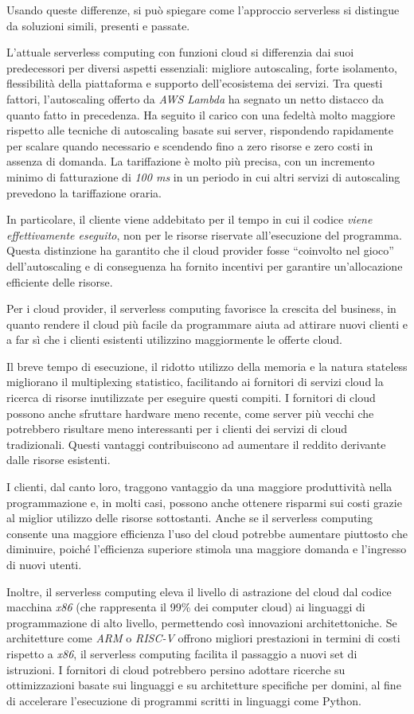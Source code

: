 Usando queste differenze, si può spiegare come l'approccio serverless si distingue da soluzioni simili, presenti e passate.

L'attuale serverless computing con funzioni cloud si differenzia dai suoi predecessori per diversi aspetti essenziali: migliore autoscaling, forte isolamento, flessibilità della piattaforma e supporto dell'ecosistema dei servizi. Tra questi fattori, l'autoscaling offerto da \textit{AWS Lambda} ha segnato un netto distacco da quanto fatto in precedenza. Ha seguito il carico con una fedeltà molto maggiore rispetto alle tecniche di autoscaling basate sui server, rispondendo rapidamente per scalare quando necessario e scendendo fino a zero risorse e zero costi in assenza di domanda. La tariffazione è molto più precisa, con un incremento minimo di fatturazione di \textit{100 ms} in un periodo in cui altri servizi di autoscaling prevedono la tariffazione oraria.

In particolare, il cliente viene addebitato per il tempo in cui il codice \textit{viene effettivamente eseguito}, non per le risorse riservate all'esecuzione del programma. Questa distinzione ha garantito che il cloud provider fosse “coinvolto nel gioco” dell'autoscaling e di conseguenza ha fornito incentivi per garantire un'allocazione efficiente delle risorse.

Per i cloud provider, il serverless computing favorisce la crescita del business, in quanto rendere il cloud più facile da programmare aiuta ad attirare nuovi clienti e a far sì che i clienti esistenti utilizzino maggiormente le offerte cloud.

Il breve tempo di esecuzione, il ridotto utilizzo della memoria e la natura stateless migliorano il multiplexing statistico, facilitando ai fornitori di servizi cloud la ricerca di risorse inutilizzate per eseguire questi compiti. I fornitori di cloud possono anche sfruttare hardware meno recente, come server più vecchi che potrebbero risultare meno interessanti per i clienti dei servizi di cloud tradizionali. Questi vantaggi contribuiscono ad aumentare il reddito derivante dalle risorse esistenti.

I clienti, dal canto loro, traggono vantaggio da una maggiore produttività nella programmazione e, in molti casi, possono anche ottenere risparmi sui costi grazie al miglior utilizzo delle risorse sottostanti. Anche se il serverless computing consente una maggiore efficienza l'uso del cloud potrebbe aumentare piuttosto che diminuire, poiché l'efficienza superiore stimola una maggiore domanda e l'ingresso di nuovi utenti.

Inoltre, il serverless computing eleva il livello di astrazione del cloud dal codice macchina \textit{x86} (che rappresenta il 99\% dei computer cloud) ai linguaggi di programmazione di alto livello, permettendo così innovazioni architettoniche. Se architetture come \textit{ARM} o \textit{RISC-V} offrono migliori prestazioni in termini di costi rispetto a \textit{x86}, il serverless computing facilita il passaggio a nuovi set di istruzioni. I fornitori di cloud potrebbero persino adottare ricerche su ottimizzazioni basate sui linguaggi e su architetture specifiche per domini, al fine di accelerare l'esecuzione di programmi scritti in linguaggi come Python.\cite{jonas2019cloud}